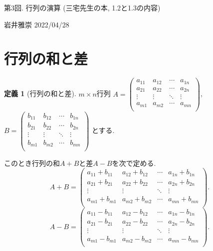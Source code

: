 \documentclass[dvipdfmx,a4paper,11pt]{article}
\theoremstyle{definition}
\newtheorem{dfn}[thm]{定義}
\begin{document}
\begin{center}
{\Large 第3回. 行列の演算 (三宅先生の本, 1.2と1.3の内容)}
\end{center}

\begin{flushright}
 岩井雅崇 2022/04/28
\end{flushright}



\section{行列の和と差}

 \begin{tcolorbox}[
    colback = white,
    colframe = green!35!black,
    fonttitle = \bfseries,
    breakable = true]
    \begin{dfn}[行列の和と差]
    \text{}
 
$m \times n$行列
$
A=\begin{pmatrix}
a_{11}& a_{12} & \cdots &a_{1n} \\
a_{21}& a_{22} & \cdots &a_{2n} \\
\vdots& \vdots	&	\ddots   &	\vdots \\
a_{m1}& a_{m2} & \cdots &a_{mn} \\
\end{pmatrix}
$, 
$
B=\begin{pmatrix}
b_{11}& b_{12} & \cdots &b_{1n} \\
b_{21}& b_{22} & \cdots &b_{2n} \\
\vdots& \vdots	&	\ddots   &	\vdots \\
b_{m1}& b_{m2} & \cdots &b_{mn} \\
\end{pmatrix}
$
とする.

このとき行列の和$A+B$と差$A-B$を次で定める.
$$
A+B=
\begin{pmatrix}
a_{11}+b_{11}& a_{12}+b_{12}& \cdots &a_{1n} +b_{1n}\\
a_{21}+b_{21}& a_{22}+b_{22}& \cdots &a_{2n}+b_{2n} \\
\vdots& \vdots	&	\ddots   &	\vdots \\
a_{m1}+b_{m1}& a_{m2} +b_{m2}& \cdots &a_{mn} +b_{mn}\\
\end{pmatrix}.
$$
$$
A-B=
\begin{pmatrix}
a_{11}-b_{11}& a_{12}-b_{12}& \cdots &a_{1n} -b_{1n}\\
a_{21}-b_{21}& a_{22}-b_{22}& \cdots &a_{2n}-b_{2n} \\
\vdots& \vdots	&	\ddots   &	\vdots \\
a_{m1}-b_{m1}& a_{m2}-b_{m2}& \cdots &a_{mn}-b_{mn}\\
\end{pmatrix}.
$$
  \end{dfn}
 \end{tcolorbox}
 
\end{document}
